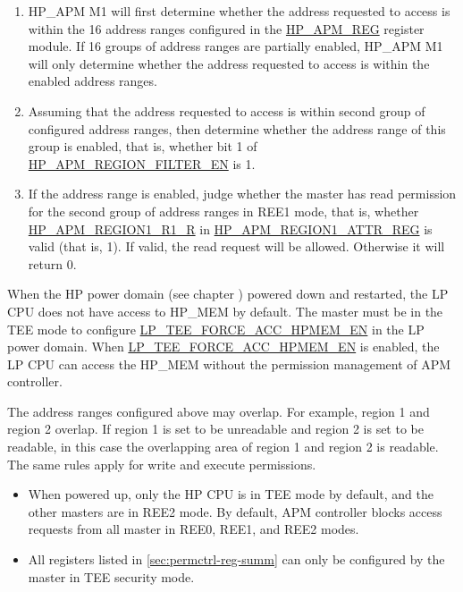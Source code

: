 \documentclass[main\_\_EN.tex]{subfiles}
\begin{document}
\begin{enumerate}
    \item HP\_APM M1 will first determine whether the address requested to access is within the 16 address ranges configured in the \hyperref[sec:permctrl-reg-hp]{HP\_APM\_REG} register module. If  16 groups of address ranges are partially enabled, HP\_APM M1 will only determine whether the address requested to access is within the enabled address ranges.
    
    \item Assuming that the address requested to access is within second group of configured address ranges, then determine whether the address range of this group is enabled, that is, whether bit 1 of \hyperref[fielddesc:HPAPMREGIONFILTEREN]{HP\_APM\_REGION\_FILTER\_EN} is 1.
    
    \item If the address range is enabled, judge whether the master has read permission for the second group of address ranges in REE1 mode, that is, whether \hyperref[fielddesc:HPAPMREGION0R1R]{HP\_APM\_REGION1\_R1\_R} in \hyperref[regdesc:HPAPMREGION0ATTRREG]{HP\_APM\_REGION1\_ATTR\_REG} is valid (that is, 1). If valid, the read request will be allowed. Otherwise it will return 0.
    
\end{enumerate}




When the HP power domain (see chapter \textit{}) powered down and restarted, the LP CPU does not have access to HP\_MEM by default. The master must be in the TEE mode to configure  \hyperref[fielddesc:LPTEEFORCEACCHPMEMEN]{LP\_TEE\_FORCE\_ACC\_HPMEM\_EN} in the LP power domain. When \hyperref[fielddesc:LPTEEFORCEACCHPMEMEN]{LP\_TEE\_FORCE\_ACC\_HPMEM\_EN} is enabled, the LP CPU can access the HP\_MEM without the permission management of APM controller.

The address ranges configured above may overlap. For example, region 1 and region 2 overlap. If region 1 is set to be unreadable and region 2 is set to be readable, in this case the overlapping area of region 1 and region 2 is readable. The same rules apply for write and execute permissions.

\begin{tiplisting}

\vspace{-2em}
\begin{itemize}
    \item When powered up, only the HP CPU is in TEE mode by default, and the other masters are in REE2 mode. By default, APM controller blocks access requests from all master in REE0, REE1, and REE2 modes.
    \item All registers listed in \ref{sec:permctrl-reg-summ} \textit{}  can only be configured by the master in TEE security mode.
\end{itemize}
\end{tiplisting}
\end{document}
